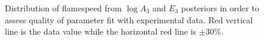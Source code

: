 \begin{figure}[H]
  \caption{Distribution of flamespeed from $\log A_3$ and $E_3$
    posteriors in order to
     assess quality of parameter fit with experimental data. Red
     vertical line is the data value while the horizontal red line is
     $\pm 30\%$.}
\end{figure}
